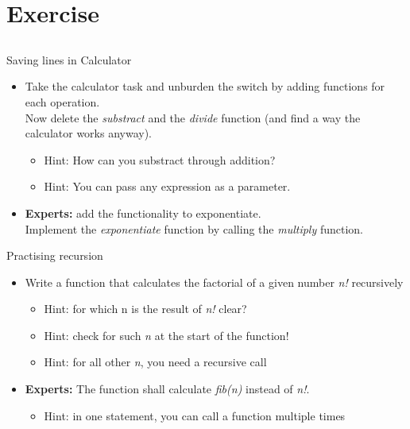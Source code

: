 \section{Exercise}
\subsection{}
\begin{frame}{Saving lines in Calculator}
	\begin{itemize}
		\item Take the calculator task and unburden the switch by adding functions for each operation.\\
		Now delete the \textit{substract} and the \textit{divide} function (and find a way the calculator works anyway).
		\begin{itemize}
			\item<2-> Hint: How can you substract through addition?
			\item<3-> Hint: You can pass any expression as a parameter.
		\end{itemize}
		\item \textbf{Experts:} add the functionality to exponentiate.\\
		Implement the \textit{exponentiate} function by calling the \textit{multiply} function.
	\end{itemize}
\end{frame}
\begin{frame}{Practising recursion}
	\begin{itemize}
		\item Write a function that calculates the factorial of a given number \textit{n!}    recursively
		\begin{itemize}
			\item<2-> Hint: for which n is the result of \textit{n!} clear?
			\item<3-> Hint: check for such \textit{n} at the start of the function!
			\item<4-> Hint: for all other \textit{n}, you need a recursive call
		\end{itemize}
		\item \textbf{Experts:} The function shall calculate \textit{fib(n)} instead of \textit{n!}.
		\begin{itemize}
			\item<5-> Hint: in one statement, you can call a function multiple times
		\end{itemize}
	\end{itemize}
\end{frame}

